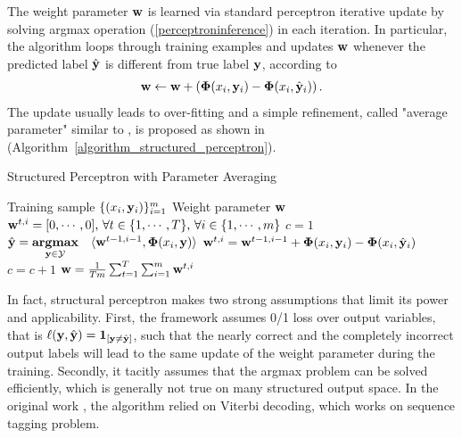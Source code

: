 The weight parameter $\mathbf {w}$ is learned via standard perceptron iterative update by solving argmax operation (\ref{perceptroninference}) in each iteration.
In particular, the algorithm loops through training examples and updates $\mathbf {w}$ whenever the predicted label $\hat{\mathbf {y}}$ is different from true label $\mathbf {y}$, according to 
\begin{align*}
	\mathbf {w} \leftarrow \mathbf {w} + \left(\mathbf{\Phi}(x_i,\mathbf {y}_i) - \mathbf{\Phi}(x_i,\hat{\mathbf {y}}_i)\right).
\end{align*}
The update usually leads to over-fitting and a simple refinement, called "average parameter" similar to \citep{freund99}, is proposed as shown in (Algorithm~\ref{algorithm_structured_perceptron}).
\begin{algorithm}
\caption{Structured Perceptron with Parameter Averaging}
\label{algorithm_structured_perceptron}
\begin{algorithmic}[1]
	\REQUIRE Training sample $\lbrace (x_i,\mathbf {y}_i)\rbrace_{i=1}^m$
	\ENSURE Weight parameter $\mathbf {w}$
	\STATE $\mathbf {w}^{t,i}=[0,\cdots,0],\,\forall t\in\{1,\cdots,T\},\,\forall i\in\{1,\cdots,m\}$
	\STATE $c = 1$
			\STATE $\hat{\mathbf {y}} = \underset{\mathbf {y}\in\mathcal{Y}}{\textbf{argmax}} \quad \langle \mathbf {w}^{t-1,i-1}, \mathbf{\Phi}(x_i,\mathbf {y}) \rangle$
			\IF{$\hat{\vy}\neq\vy$}
				\STATE $\mathbf {w}^{t,i} = \mathbf {w}^{t-1,i-1} + \mathbf{\Phi}(x_i,\mathbf {y}_i) - \mathbf{\Phi}(x_i,\hat{\mathbf {y}}_i)$
			\ENDIF
			\STATE $c=c+1$
		\ENDFOR
	\ENDFOR
	\RETURN $\mathbf {w} = \frac{1}{Tm}\sum_{t=1}^{T}\sum_{i=1}^{m}\mathbf {w}^{t,i}$
\end{algorithmic}
\end{algorithm}

In fact, structural perceptron makes two strong assumptions that limit its power and applicability.
First, the framework assumes 0/1 loss over output variables, that is $\mathbf {\ell}(\mathbf {y},\hat{\mathbf {y}})=\mathbf {1}_{[ \mathbf {y}\neq\hat{\mathbf {y}} ]}$, such that the nearly correct and the completely incorrect output labels will lead to the same update of the weight parameter during the training.
Secondly, it tacitly assumes that the argmax problem can be solved efficiently, which is generally not true on many structured output space.
In the original work \citep{collins02a}, the algorithm relied on Viterbi decoding, which works on sequence tagging problem.



%
